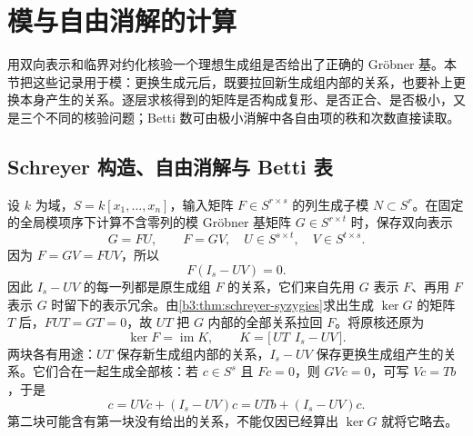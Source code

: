 
\section{模与自由消解的计算}
\label{b3:sec:B04}

用双向表示和临界对约化核验一个理想生成组是否给出了正确的 Gröbner 基。本节把这些记录用于模：更换生成元后，既要拉回新生成组内部的关系，也要补上更换本身产生的关系。逐层求核得到的矩阵是否构成复形、是否正合、是否极小，又是三个不同的核验问题；Betti 数可由极小消解中各自由项的秩和次数直接读取。

%
%
%


\subsection{Schreyer 构造、自由消解与 Betti 表}
\label{b3:subsec:B04:01}

设 \(k\) 为域，\(S=k[x_1,\ldots,x_n]\)，输入矩阵 \(F\in S^{r\times s}\) 的列生成子模 \(N\subset S^r\)。在固定的全局模项序下计算不含零列的模 Gröbner 基矩阵 \(G\in S^{r\times t}\) 时，保存双向表示
\[
	G=FU,\qquad F=GV, \quad U\in S^{s\times t},\quad V\in S^{t\times s}.
\]
因为 \(F=GV=FUV\)，所以
\[
	F(I_s-UV)=0.
\]
因此 \(I_s-UV\) 的每一列都是原生成组 \(F\) 的关系，它们来自先用 \(G\) 表示 \(F\)、再用 \(F\) 表示 \(G\) 时留下的表示冗余。由\cref{b3:thm:schreyer-syzygies}求出生成 \(\ker G\) 的矩阵 \(T\) 后，\(FUT=GT=0\)，故 \(UT\) 把 \(G\) 内部的全部关系拉回 \(F\)。将原核还原为
\[
	\ker F=\operatorname{im}K,\qquad K=\bigl[\,UT\ \ I_s-UV\,\bigr].
\]
两块各有用途：\(UT\) 保存新生成组内部的关系，\(I_s-UV\) 保存更换生成组产生的关系。它们合在一起生成全部核：若 \(c\in S^s\) 且 \(Fc=0\)，则 \(GVc=0\)，可写 \(Vc=Tb\)，于是
\[
	c=UVc+(I_s-UV)c=UTb+(I_s-UV)c.
\]
第二块可能含有第一块没有给出的关系，不能仅因已经算出 \(\ker G\) 就将它略去。

